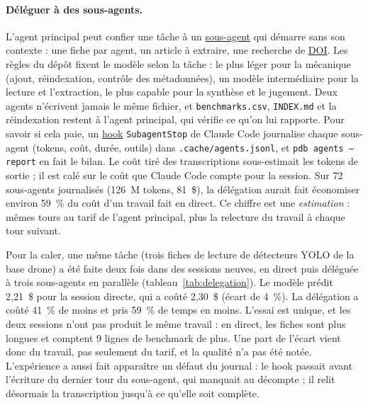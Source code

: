 \documentclass[11pt,a4paper]{article}
\newcommand{\cmd}[1]{\texttt{#1}}
\newcommand{\gl}[2]{\hyperlink{gl:#1}{\textcolor{glcolor}{#2}}}
\begin{document}
\paragraph{Déléguer à des sous-agents.}
\label{sec:delegation}
L'agent principal peut confier une tâche à un \gl{sousagent}{sous-agent} qui démarre sans son contexte :
une fiche par agent, un article à extraire, une recherche de \gl{DOI}{DOI}. Les règles du dépôt fixent le
modèle selon la tâche : le plus léger pour la mécanique (ajout, réindexation, contrôle des
métadonnées), un modèle intermédiaire pour la lecture et l'extraction, le plus capable pour
la synthèse et le jugement. Deux agents n'écrivent jamais le même fichier, et
\cmd{benchmarks.csv}, \cmd{INDEX.md} et la réindexation restent à l'agent principal, qui
vérifie ce qu'on lui rapporte. Pour savoir si cela paie, un \gl{hook}{hook} \cmd{SubagentStop} de Claude
Code journalise chaque sous-agent (tokens, coût, durée, outils) dans \cmd{.cache/agents.jsonl},
et \cmd{pdb agents --report} en fait le bilan. Le coût tiré des transcriptions sous-estimait
les tokens de sortie ; il est calé sur le coût que Claude Code compte pour la session. Sur
72 sous-agents journalisés (126~M tokens, 81~\$), la délégation aurait fait économiser
environ 59~\% du coût d'un travail fait en direct. Ce chiffre est une \emph{estimation} :
mêmes tours au tarif de l'agent principal, plus la relecture du travail à chaque tour
suivant.

Pour la caler, une même tâche (trois fiches de lecture de détecteurs YOLO de la base drone)
a été faite deux fois dans des sessions neuves, en direct puis déléguée à trois sous-agents
en parallèle (tableau~\ref{tab:delegation}). Le modèle prédit 2,21~\$ pour la session
directe, qui a coûté 2,30~\$ (écart de 4~\%). La délégation a coûté 41~\% de moins et pris
59~\% de temps en moins. L'essai est unique, et les deux sessions n'ont pas produit le même
travail : en direct, les fiches sont plus longues et comptent 9 lignes de benchmark de plus.
Une part de l'écart vient donc du travail, pas seulement du tarif, et la qualité n'a pas été
notée. L'expérience a aussi fait apparaître un défaut du journal : le hook passait avant
l'écriture du dernier tour du sous-agent, qui manquait au décompte ; il relit désormais la
transcription jusqu'à ce qu'elle soit complète.
\end{document}

